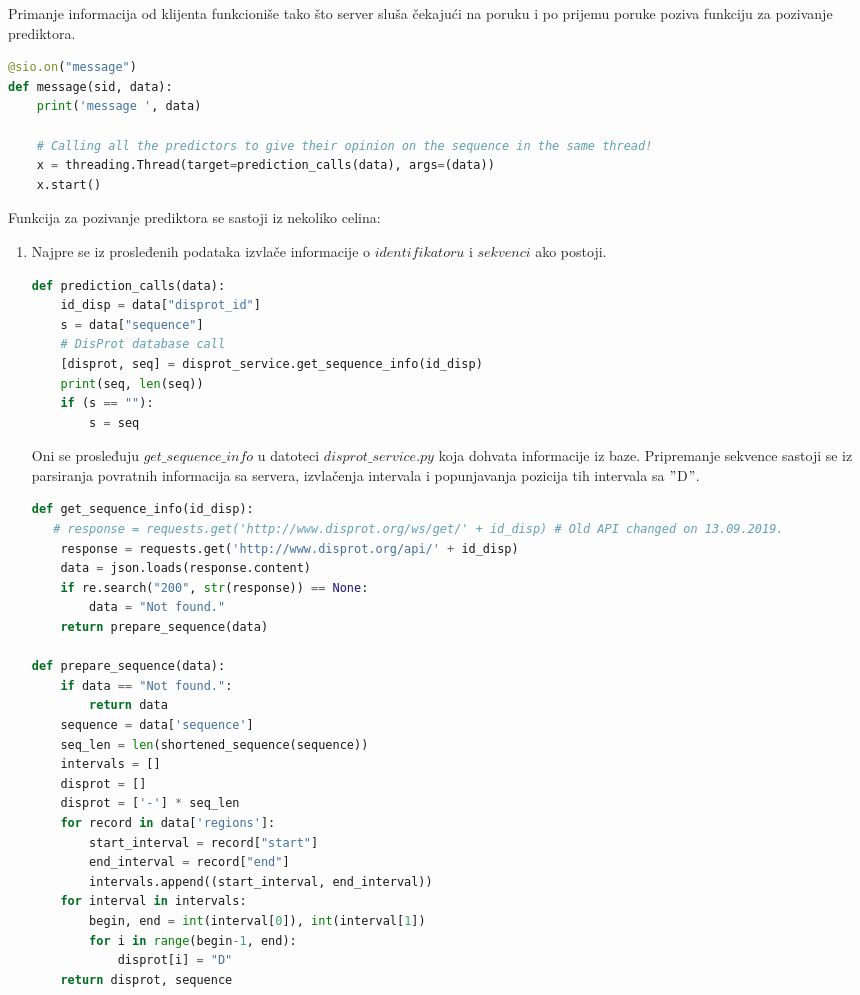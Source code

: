 Primanje informacija od klijenta funkcioniše tako što server sluša čekajući na poruku i po prijemu poruke poziva funkciju za pozivanje prediktora.
\begin{lstlisting}[language=Python]
@sio.on("message")
def message(sid, data):
    print('message ', data)
    
    # Calling all the predictors to give their opinion on the sequence in the same thread!
    x = threading.Thread(target=prediction_calls(data), args=(data))
    x.start()
\end{lstlisting}

Funkcija za pozivanje prediktora se sastoji iz nekoliko celina:
\begin{enumerate}
\item Najpre se iz prosleđenih podataka izvlače informacije o $identifikatoru$ i $sekvenci$ ako postoji. 
\begin{lstlisting}[language=Python]
def prediction_calls(data):
    id_disp = data["disprot_id"]
    s = data["sequence"]
    # DisProt database call
    [disprot, seq] = disprot_service.get_sequence_info(id_disp)
    print(seq, len(seq))
    if (s == ""):
        s = seq
\end{lstlisting}
Oni se prosleđuju $get\_sequence\_info$ u datoteci $disprot\_service.py$ koja dohvata informacije iz baze. Pripremanje sekvence sastoji se iz parsiranja povratnih informacija sa servera, izvlačenja intervala i popunjavanja pozicija tih intervala sa $"$D$"$.
\begin{lstlisting}[language=Python]
def get_sequence_info(id_disp):
   # response = requests.get('http://www.disprot.org/ws/get/' + id_disp) # Old API changed on 13.09.2019.
    response = requests.get('http://www.disprot.org/api/' + id_disp)
    data = json.loads(response.content)
    if re.search("200", str(response)) == None:
        data = "Not found."
    return prepare_sequence(data)
    
def prepare_sequence(data):
    if data == "Not found.":
        return data
    sequence = data['sequence']
    seq_len = len(shortened_sequence(sequence)) 
    intervals = []
    disprot = []
    disprot = ['-'] * seq_len
    for record in data['regions']:
        start_interval = record["start"]
        end_interval = record["end"]
        intervals.append((start_interval, end_interval))
    for interval in intervals:
        begin, end = int(interval[0]), int(interval[1])
        for i in range(begin-1, end):
            disprot[i] = "D"
    return disprot, sequence
\end{lstlisting}


\end{enumerate}
